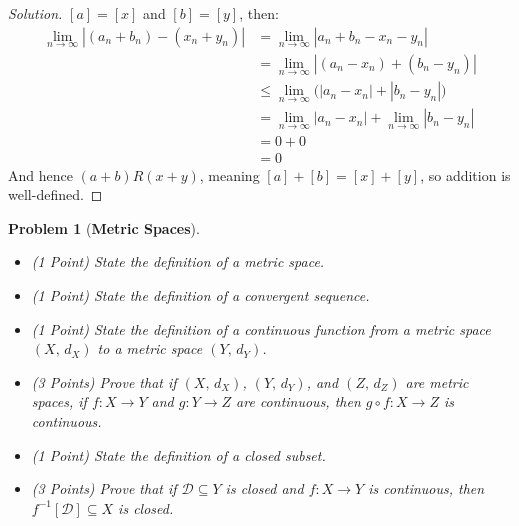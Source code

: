 \documentclass{article}
\theoremstyle{normal}
\newtheorem{problem}{Problem}
\begin{document}
\begin{proof}[Solution]
        $[a]=[x]$ and $[b]=[y]$, then:
        \begin{align}
            \lim_{n\rightarrow\infty}|(a_{n}+b_{n})-(x_{n}+y_{n})|
            &=\lim_{n\rightarrow\infty}|a_{n}+b_{n}-x_{n}-y_{n}|\\
            &=\lim_{n\rightarrow\infty}|(a_{n}-x_{n})+(b_{n}-y_{n})|\\
            &\leq\lim_{n\rightarrow\infty}
                \big(|a_{n}-x_{n}|+|b_{n}-y_{n}|\big)\\
            &=\lim_{n\rightarrow\infty}|a_{n}-x_{n}|
                +\lim_{n\rightarrow\infty}|b_{n}-y_{n}|\\
            &=0+0\\
            &=0
        \end{align}
        And hence $(a+b)R(x+y)$, meaning $[a]+[b]=[x]+[y]$, so addition is
        well-defined.
    \end{proof}
    \clearpage
    \color{blue}
    \begin{problem}[\textbf{Metric Spaces}]
        \par\hfill\par\vspace{1em}
        \begin{itemize}
            \item (1 Point) State the definition of a metric space.
            \item (1 Point) State the definition of a convergent sequence.
            \item (1 Point) State the definition of a continuous function
                from a metric space $(X,\,d_{X})$ to a
                metric space $(Y,\,d_{Y})$.
            \item (3 Points) Prove that if $(X,\,d_{X})$, $(Y,\,d_{Y})$, and
                $(Z,\,d_{Z})$ are metric spaces, if $f:X\rightarrow{Y}$ and
                $g:Y\rightarrow{Z}$ are continuous, then
                $g\circ{f}:X\rightarrow{Z}$ is continuous.
            \item (1 Point) State the definition of a closed subset.
            \item (3 Points) Prove that if $\mathcal{D}\subseteq{Y}$ is closed
                and $f:X\rightarrow{Y}$ is continuous, then
                $f^{-1}[\mathcal{D}]\subseteq{X}$ is closed.
        \end{itemize}
    \end{problem}
    \color{black}
\end{document}
